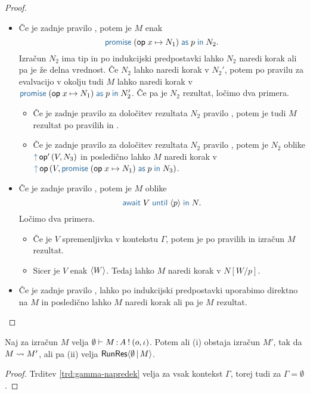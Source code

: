 \begin{proof}
\begin{itemize}
		
		\item Če je zadnje pravilo , potem je $M$ enak $$\tmwith{op}{x}{N_1}{p}{N_2}.$$
		Izračun $N_2$ ima tip in po indukcijski predpostavki lahko $N_2$ naredi korak ali pa je že delna vrednost.
		Če $N_2$ lahko naredi korak v $N_2'$, potem po pravilu za evalvacijo v okolju tudi $M$ lahko naredi korak v $\tmwith{op}{x}{N_1}{p}{N_2'}$.
		Če pa je $N_2$ rezultat, ločimo dva primera.
		\begin{itemize}
			\item Če je zadnje pravilo za določitev rezultata $N_2$ pravilo , potem je tudi $M$ rezultat po pravilih  in .
			\item Če je zadnje pravilo za določitev rezultata $N_2$ pravilo , potem je $N_2$ oblike $\tmopout{op'}{V}{N_3}$ in posledično lahko $M$ naredi korak v $\tmopout{op}{V}{\tmwith{op}{x}{N_1}{p}{N_3}}$.
		\end{itemize}
		 
		
		\item Če je zadnje pravilo , potem je $M$ oblike $$\tmawait{V}{p}{N}.$$
		Ločimo dva primera.
		\begin{itemize}
			\item Če je $V$ spremenljivka v kontekstu $\Gamma$, potem je po pravilih  in  izračun $M$ rezultat.
			\item Sicer je $V$ enak $\langle W \rangle$. Tedaj lahko $M$ naredi korak v $N[W/p]$.
		\end{itemize}
		
		\item Če je zadnje pravilo , lahko po indukcijski predpostavki uporabimo direktno na $M$ in posledično lahko $M$ naredi korak ali pa je $M$ rezultat.
			
	\end{itemize}
	
\end{proof}


\begin{posledica}[o napredku]\label{pos:prazen-napredek}
	Naj za izračun $M$ velja $\emptyset \vdash M \mathinner{:} A \mathbin{!} (o, \iota)$. Potem ali (i) obstaja izračun $M'$, tak da $M \leadsto M'$, ali pa (ii) velja $\mathsf{RunRes}\langle\emptyset \,\vert\, M\rangle$.
\end{posledica}

\begin{proof}
	Trditev \ref{trd:gamma-napredek} velja za vsak kontekst $\Gamma$, torej tudi za $\Gamma = \emptyset$.
\end{proof}


